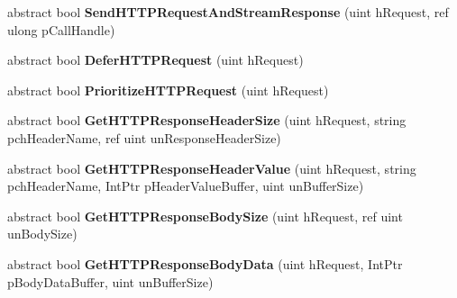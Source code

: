\begin{DoxyCompactItemize}
\item 
\hypertarget{classValve_1_1Steamworks_1_1ISteamHTTP_a648a5e8e58125e9e31a1ebb5bb08506c}{}abstract bool {\bfseries Send\+H\+T\+T\+P\+Request\+And\+Stream\+Response} (uint h\+Request, ref ulong p\+Call\+Handle)\label{classValve_1_1Steamworks_1_1ISteamHTTP_a648a5e8e58125e9e31a1ebb5bb08506c}

\item 
\hypertarget{classValve_1_1Steamworks_1_1ISteamHTTP_aeedc029de0626593c1642723eb697110}{}abstract bool {\bfseries Defer\+H\+T\+T\+P\+Request} (uint h\+Request)\label{classValve_1_1Steamworks_1_1ISteamHTTP_aeedc029de0626593c1642723eb697110}

\item 
\hypertarget{classValve_1_1Steamworks_1_1ISteamHTTP_ab851e87f31ac556fe562813f56a0d23c}{}abstract bool {\bfseries Prioritize\+H\+T\+T\+P\+Request} (uint h\+Request)\label{classValve_1_1Steamworks_1_1ISteamHTTP_ab851e87f31ac556fe562813f56a0d23c}

\item 
\hypertarget{classValve_1_1Steamworks_1_1ISteamHTTP_adbf0dbd3e35ffc691d3dda06ccac00a6}{}abstract bool {\bfseries Get\+H\+T\+T\+P\+Response\+Header\+Size} (uint h\+Request, string pch\+Header\+Name, ref uint un\+Response\+Header\+Size)\label{classValve_1_1Steamworks_1_1ISteamHTTP_adbf0dbd3e35ffc691d3dda06ccac00a6}

\item 
\hypertarget{classValve_1_1Steamworks_1_1ISteamHTTP_af39c4cde56d629cfce6fbe2aaefd224e}{}abstract bool {\bfseries Get\+H\+T\+T\+P\+Response\+Header\+Value} (uint h\+Request, string pch\+Header\+Name, Int\+Ptr p\+Header\+Value\+Buffer, uint un\+Buffer\+Size)\label{classValve_1_1Steamworks_1_1ISteamHTTP_af39c4cde56d629cfce6fbe2aaefd224e}

\item 
\hypertarget{classValve_1_1Steamworks_1_1ISteamHTTP_a11ef4ed524479aebd51eda1f51f7eaae}{}abstract bool {\bfseries Get\+H\+T\+T\+P\+Response\+Body\+Size} (uint h\+Request, ref uint un\+Body\+Size)\label{classValve_1_1Steamworks_1_1ISteamHTTP_a11ef4ed524479aebd51eda1f51f7eaae}

\item 
\hypertarget{classValve_1_1Steamworks_1_1ISteamHTTP_ae6bce94268b0487f9e27c5d1de6859c7}{}abstract bool {\bfseries Get\+H\+T\+T\+P\+Response\+Body\+Data} (uint h\+Request, Int\+Ptr p\+Body\+Data\+Buffer, uint un\+Buffer\+Size)\label{classValve_1_1Steamworks_1_1ISteamHTTP_ae6bce94268b0487f9e27c5d1de6859c7}


\end{DoxyCompactItemize}
